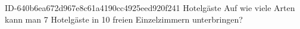 \begin{exercise}
      {ID-640b6ea672d967e8c61a4190cc4925eed920f241}
      {Hotelgäste}
  \ifproblem\problem
    Auf wie viele Arten kann man 7 Hotelgäste in 10 freien Einzelzimmern
    unterbringen?
  \fi
\end{exercise}
